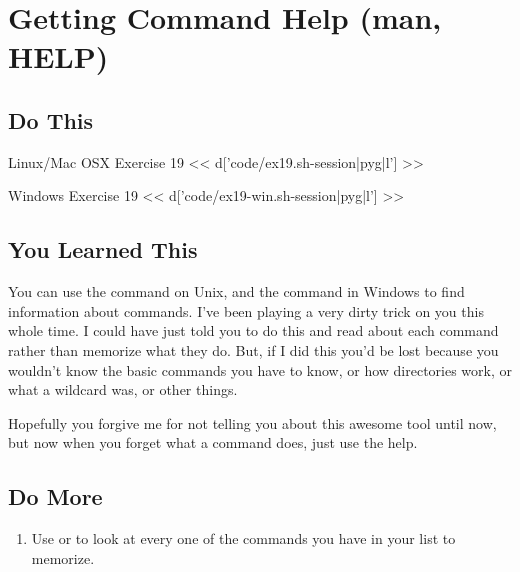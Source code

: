 \chapter{Getting Command Help (man, HELP)}

\section{Do This}

\begin{code}{Linux/Mac OSX Exercise 19}
<< d['code/ex19.sh-session|pyg|l'] >>
\end{code}

\begin{code}{Windows Exercise 19}
<< d['code/ex19-win.sh-session|pyg|l'] >>
\end{code}

\section{You Learned This}

You can use the  command on Unix, and the  command
in Windows to find information about commands.  I've been playing a very dirty
trick on you this whole time.  I could have just told you to do this and read
about each command rather than memorize what they do.  But, if I did this you'd
be lost because you wouldn't know the basic commands you have to know, or how
directories work, or what a wildcard was, or other things.

Hopefully you forgive me for not telling you about this awesome tool until now,
but now when you forget what a command does, just use the help.

\section{Do More}

\begin{enumerate}
\item Use  or  to look at every one of the commands you have in your list to memorize.
\end{enumerate}

